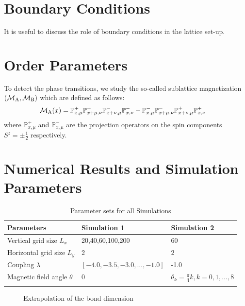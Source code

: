 \documentclass[12pt, a4paper, twoside, titlepage]{article}
\newcommand{\M}[1]{\ensuremath{\mathcal{M}_{\rm #1}}}
\newcommand{\Pp}[1]{\ensuremath{\mathbb{P}^{+}_{#1}}}
\newcommand{\Pm}[1]{\ensuremath{\mathbb{P}^{-}_{#1}}}
\begin{document}
\section{Boundary Conditions}
  It is useful to discuss the role of boundary conditions in the lattice set-up.

\section{Order Parameters}
 To detect the phase transitions, we study the so-called sublattice
 magnetization $( \M{A}, \M{B})$ which are defined as follows:
 \begin{align}
	 \M{A}(x) &= \Pp{x,\mu} \Pp{x+\mu,\nu} \Pm{x+\nu,\mu} \Pm{x,\nu} -
          \Pm{x,\mu} \Pm{x+\mu,\nu} \Pp{x+\nu,\mu} \Pp{x,\nu}
 \end{align}
 where $\Pp{x,\mu}$ and $\Pm{x,\mu}$ are the projection operators
 on the spin components $S^z = \pm \frac{1}{2}$ respectively.


\newpage
\section{Numerical Results and Simulation Parameters}

\begin{table}[htp!]
\centering
\caption{Parameter sets for all Simulations}
\smallskip
{}
\begin{tabular}{l l l}
\toprule
Parameters & \multicolumn{1}{l}{Simulation 1} & \multicolumn{1}{l}{Simulation 2} \\
\midrule
\rowcolor[gray]{.9}
Vertical grid size $L_x$ & {20,40,60,100,200} & 60\\
Horizontal grid size $L_y$           & 2 & 2 \\
\rowcolor[gray]{.9}
Coupling $\lambda$ & $[-4.0,-3.5,-3.0,\dots,-1.0]$ & -1.0\\
Magnetic field angle $\theta$       & 0 & $\theta_k =\frac{\pi}{4}k, k = 0,1,\dots,8$ \\
\rowcolor[gray]{.9}
\bottomrule
\end{tabular}
\end{table}

\begin{figure}[htp!]
  \caption{Extrapolation of the bond dimension}
  \label{}
\end{figure}
\end{document}
